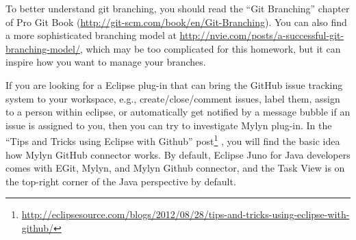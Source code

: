 To better understand git branching, you should read the ``Git Branching''
chapter of Pro Git Book (\url{http://git-scm.com/book/en/Git-Branching}). You
can also find a more sophisticated branching model at
\url{http://nvie.com/posts/a-successful-git-branching-model/}, which may be too
complicated for this homework, but it can inspire how you want to manage your
branches.

If you are looking for a Eclipse plug-in that can bring the GitHub issue
tracking system to your workspace, e.g., create/close/comment issues, label
them, assign to a person within eclipse, or automatically get notified by a
message bubble if an issue is assigned to you, then you can try to investigate
Mylyn plug-in. In the ``Tips and Tricks using Eclipse with Github''
post\footnote{
\url{http://eclipsesource.com/blogs/2012/08/28/tips-and-tricks-using-eclipse-with-github/}}
, you will find the basic idea how Mylyn GitHub connector works. By default,
Eclipse Juno for Java developers comes with EGit, Mylyn, and Mylyn Github
connector, and the Task View is on the top-right corner of the Java perspective
by default.
